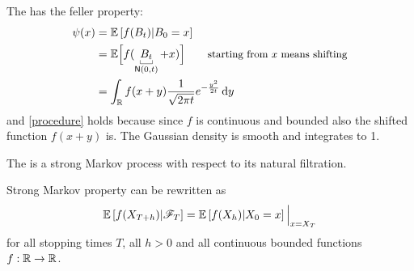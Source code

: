 \documentclass[12pt]{report}
\begin{document}
\begin{remark}
	The \bwm{} has the feller property:
	\begin{align*}
		\psi(x)&=\ev{f(B_{t})|B_{0}=x}\\
		&=\evs\Bigl[{f(\ubracketthin{B_{t}}_{\mathsf{N}(0,t)}+x)}\Bigr]\qquad\text{\small starting from $x$ means shifting}\\
		&=\int_{\R}f(x+y)\frac{1}{\sqrt{2\pi t}}e^{-\frac{y^{2}}{2t}}\dy
	\end{align*}
	and \ref{procedure} holds because since $f$ is continuous and bounded also the shifted function $f(x+y)$ is. The Gaussian density is smooth and integrates to 1.
\end{remark}
\begin{theorem}
	The \bwm{} is a strong Markov process with respect to its natural filtration.
\end{theorem}
\begin{remark}
	Strong Markov property can be rewritten as
	\begin{equation*}
		\mathbb{E}\left[f(X_{T+h})|\mathscr{F}_{T}\right]=\mathbb{E}\left[f(X_{h})|X_{0}=x\right]\Big|_{x=X_{T}}
	\end{equation*}
	for all stopping times $T$, all $h>0$ and all continuous bounded functions $f:\mathbb{R}\to\mathbb{R}$.
\end{remark}
\end{document}
